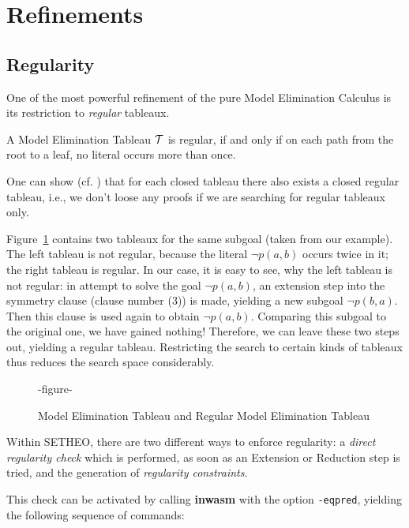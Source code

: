 \section{Refinements}
\subsection{Regularity}

One of the most powerful refinement of the pure Model Elimination
Calculus is its restriction to {\em regular\/} tableaux.

\begin{definition}
A Model Elimination Tableau $\cal T$ is regular, if and only if on
each path from the root to a leaf, no literal occurs more than once.
\end{definition}

One can show (cf. \cite{LSBB89,LMG94}) that for each closed tableau
there also exists a closed regular tableau, i.e., we don't loose any
proofs if we are searching for regular tableaux only.

Figure~\ref{fig:tut2:reg-tab} contains two tableaux for the same
subgoal (taken from our example). The left tableau is not regular,
because the literal $\neg p(a,b)$ occurs twice in it; the right tableau
is regular. In our case, it is easy to see, why the left tableau is
not regular: in attempt to solve the goal $\neg p(a,b)$, an extension
step into the symmetry clause (clause number (3)) is made, yielding
a new subgoal $\neg p(b,a)$. Then this clause is used again to
obtain $\neg p(a,b)$. Comparing this subgoal to the original one,
we have gained nothing! Therefore, we can leave these two steps out,
yielding a regular tableau. Restricting the search to certain kinds
of tableaux thus reduces the search space considerably.

\begin{figure}[htb]
-figure-
\caption{Model Elimination Tableau and Regular Model Elimination Tableau}
\label{fig:tut2:reg-tab}
\end{figure}

Within SETHEO, there are two different ways to enforce regularity:
a {\em direct regularity check\/} which is performed, as soon as an
Extension or Reduction step is tried, and the generation of {\em
regularity constraints\/}. 

 This check can be
activated by calling {\bf inwasm} with the option {\tt -eqpred},
yielding the following sequence of commands:

